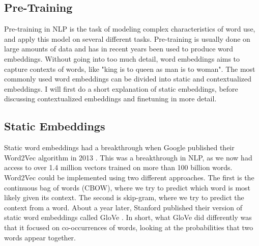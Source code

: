\documentclass{report}
\begin{document}
\subsection{Pre-Training}
\noindent
Pre-training in NLP is the task of modeling complex characteristics of word use, and apply this model on several different tasks.
Pre-training is usually done on large amounts of data and has in recent years been used to produce word embeddings. Without going into too much detail, word embeddings aims to capture contexts of words, like "king is to queen as man is to woman". The most commonly used word embeddings can be divided into static and contextualized embeddings. I will first do a short explanation of static embeddings, before discussing contextualized embeddings and finetuning in more detail.

\subsection{Static Embeddings}
Static word embeddings had a breakthrough when Google published their Word2Vec algorithm in 2013 \cite{mikolov2013efficient}. This was a breakthrough in NLP, as we now had access to over 1.4 million vectors trained on more than 100 billion words. Word2Vec could be implemented using two different approaches. The first is the continuous bag of words (CBOW), where we try to predict which word is most likely given its context. The second is skip-gram, where we try to predict the context from a word. About a year later, Stanford published their version of static word embeddings called GloVe \cite{pennington2014glove}. In short, what GloVe did differently was that it focused on co-occurrences of words, looking at the probabilities that two words appear together.

\end{document}
